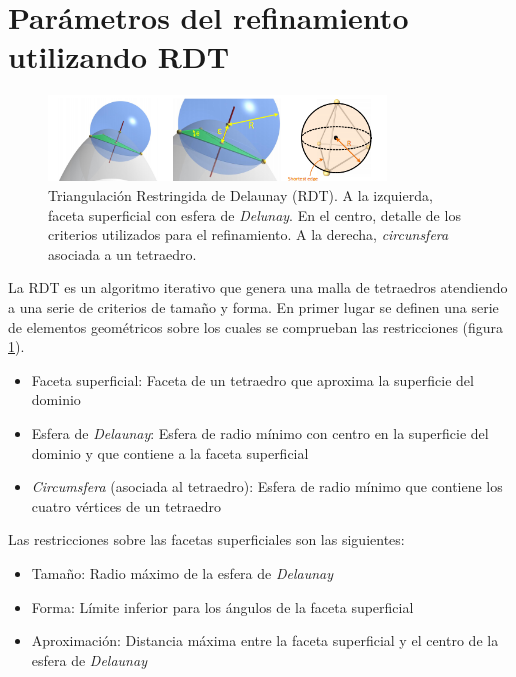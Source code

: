 \section{Parámetros del refinamiento utilizando \ac{RDT}}
\label{anexo:criterios}


\begin{figure}[h]
   \centering
    \includegraphics[width=0.8\textwidth]{IMG/rdt.png}
     \caption{Triangulación Restringida de Delaunay (\acs{RDT}). A la izquierda, faceta superficial con esfera de \emph{Delunay}. En el centro, detalle de los criterios utilizados para el refinamiento. A la derecha, \emph{circunsfera} asociada a un tetraedro.}
\label{fig:rdt}
\end{figure}


La \ac{RDT} es un algoritmo iterativo que genera una malla de tetraedros atendiendo a una serie de criterios de tamaño y forma. En primer lugar se definen una serie de elementos geométricos sobre los cuales se comprueban las restricciones (figura \ref{fig:rdt}).

\begin{itemize}
    \item Faceta superficial: Faceta de un tetraedro que aproxima la superficie del dominio
    \item Esfera de \emph{Delaunay}: Esfera de radio mínimo con centro en la superficie del dominio y que contiene a la faceta superficial
    \item \emph{Circumsfera} (asociada al tetraedro): Esfera de radio mínimo que contiene los cuatro vértices de un tetraedro
\end{itemize}




Las restricciones sobre las facetas superficiales son las siguientes:
\begin{itemize}
    \item  Tamaño: Radio máximo de la esfera de \emph{Delaunay}
    \item Forma: Límite inferior para los ángulos de la faceta superficial
    \item Aproximación: Distancia máxima entre la faceta superficial y el centro de la esfera de \emph{Delaunay}

\end{itemize}


